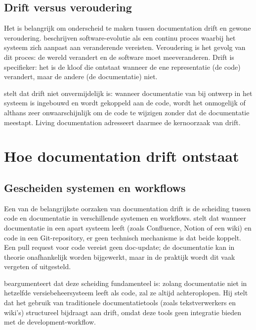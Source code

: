 \subsection{Drift versus veroudering}
Het is belangrijk om onderscheid te maken tussen documentation drift en gewone veroudering. \textcite{tripathy2014softwareevolution} beschrijven software-evolutie als een continu proces waarbij het systeem zich aanpast aan veranderende vereisten. Veroudering is het gevolg van dit proces: de wereld verandert en de software moet meeveranderen. Drift is specifieker: het is de kloof die ontstaat wanneer de ene representatie (de code) verandert, maar de andere (de documentatie) niet.

\textcite{martraire2019livingdocumentation} stelt dat drift niet onvermijdelijk is: wanneer documentatie van bij ontwerp in het systeem is ingebouwd en wordt gekoppeld aan de code, wordt het onmogelijk of althans zeer onwaarschijnlijk om de code te wijzigen zonder dat de documentatie meestapt. Living documentation adresseert daarmee de kernoorzaak van drift.

\section{Hoe documentation drift ontstaat}
\label{sec:drift-oorzaken}

\subsection{Gescheiden systemen en workflows}
Een van de belangrijkste oorzaken van documentation drift is de scheiding tussen code en documentatie in verschillende systemen en workflows. \textcite{gentle2017docslikecode} stelt dat wanneer documentatie in een apart systeem leeft (zoals Confluence, Notion of een wiki) en code in een Git-repository, er geen technisch mechanisme is dat beide koppelt. Een pull request voor code vereist geen doc-update; de documentatie kan in theorie onafhankelijk worden bijgewerkt, maar in de praktijk wordt dit vaak vergeten of uitgesteld.

\textcite{etter2016moderntechwriting} beargumenteert dat deze scheiding fundamenteel is: zolang documentatie niet in hetzelfde versiebeheersysteem leeft als code, zal ze altijd achteroplopen. Hij stelt dat het gebruik van traditionele documentatietools (zoals tekstverwerkers en wiki's) structureel bijdraagt aan drift, omdat deze tools geen integratie bieden met de development-workflow.

